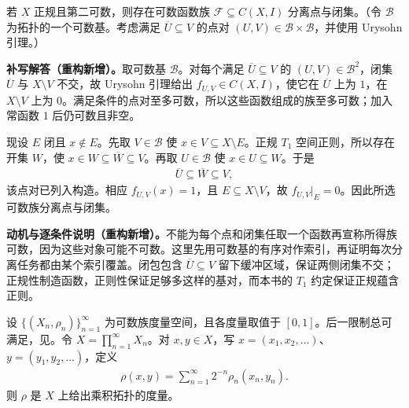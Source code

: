 \documentclass[../../main.tex]{subfiles}
\begin{document}
\begin{exercise}\label{exercise:ch04-countable-separating-family}
若 $X$ 正规且第二可数，则存在可数函数族 $\mathcal F\subseteq C(X,I)$ 分离点与闭集。（令 $\mathcal B$ 为拓扑的一个可数基。考虑满足 $\overline U\subseteq V$ 的点对 $(U,V)\in\mathcal B\times\mathcal B$，并使用 Urysohn 引理。）
\end{exercise}
\begin{solution}
\textbf{补写解答（重构新增）。}取可数基 $\mathcal B$。对每个满足 $\overline U\subseteq V$ 的 $(U,V)\in\mathcal B^2$，闭集 $\overline U$ 与 $X\setminus V$ 不交，故 Urysohn 引理给出 $f_{U,V}\in C(X,I)$，使它在 $\overline U$ 上为 $1$，在 $X\setminus V$ 上为 $0$。满足条件的点对至多可数，所以这些函数组成的族至多可数；加入常函数 $1$ 后仍可数且非空。

现设 $E$ 闭且 $x\notin E$。先取 $V\in\mathcal B$ 使 $x\in V\subseteq X\setminus E$。正规 $T_1$ 空间正则，所以存在开集 $W$，使 $x\in W\subseteq\overline W\subseteq V$。再取 $U\in\mathcal B$ 使 $x\in U\subseteq W$。于是
\begin{align*}
\overline U\subseteq\overline W\subseteq V,
\end{align*}
该点对已列入构造。相应 $f_{U,V}(x)=1$，且 $E\subseteq X\setminus V$，故 $f_{U,V}|_E=0$。因此所选可数族分离点与闭集。
\end{solution}
\begin{remark}
\textbf{动机与逐条件说明（重构新增）。}不能为每个点和闭集任取一个函数再宣称所得族可数，因为这些对象可能不可数。这里先用可数基的有序对作索引，再证明每次分离任务都由某个索引覆盖。闭包包含 $\overline U\subseteq V$ 留下缓冲区域，保证两侧闭集不交；正规性制造函数，正则性保证足够多这样的基对，而本书的 $T_1$ 约定保证正规蕴含正则。
\end{remark}
\begin{exercise}\label{exercise:ch04-countable-product-metric}
设 $\{(X_n,\rho_n)\}_{n=1}^{\infty}$ 为可数族度量空间，且各度量取值于 $[0,1]$。后一限制总可满足，见。令 $X=\prod_{n=1}^{\infty}X_n$。对 $x,y\in X$，写 $x=(x_1,x_2,\ldots)$、$y=(y_1,y_2,\ldots)$，定义
\begin{align*}
\rho(x,y)=\sum_{n=1}^{\infty}2^{-n}\rho_n(x_n,y_n).
\end{align*}
则 $\rho$ 是 $X$ 上给出乘积拓扑的度量。
\end{exercise}
\end{document}
